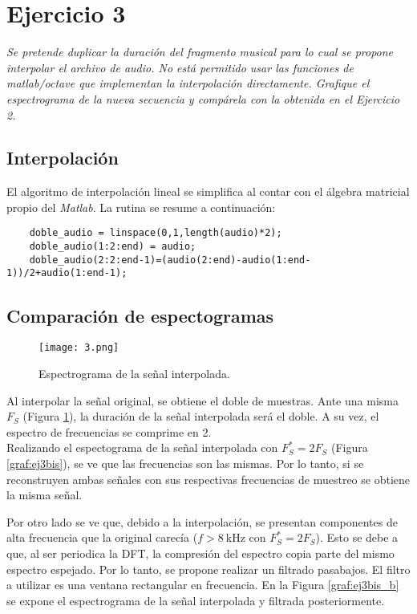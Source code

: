 

\section{Ejercicio 3} \label{ej3}
	\begin{flushleft}
		\textit{Se pretende duplicar la duración del fragmento musical para lo cual se propone interpolar el
archivo de audio. No está permitido usar las funciones de matlab/octave que implementan la
interpolación directamente. Grafique el espectrograma de la nueva secuencia y compárela con
la obtenida en el Ejercicio 2.}
	\end{flushleft}

	\subsection{Interpolación}
		El algoritmo de interpolación lineal se simplifica al contar con el álgebra matricial propio del \textit{Matlab}. La rutina se resume a continuación:
		\begin{lstlisting}
	doble_audio = linspace(0,1,length(audio)*2);
	doble_audio(1:2:end) = audio;
	doble_audio(2:2:end-1)=(audio(2:end)-audio(1:end-1))/2+audio(1:end-1);
		\end{lstlisting}

	\subsection{Comparación de espectogramas}

		\begin{figure}[h!]
			\centering
			\texttt{[image: 3.png]}
			\caption{Espectrograma de la señal interpolada.}
			\label{graf:ej3}
		\end{figure}
		Al interpolar la señal original, se obtiene el doble de muestras. Ante una misma $F_S$ (Figura \ref{graf:ej3}), la duración de la señal interpolada será el doble. A su vez, el espectro de frecuencias se comprime en 2.\\

		Realizando el espectograma de la señal interpolada con $F_S^*=2F_S$ (Figura \ref{graf:ej3bis}), se ve que las frecuencias son las mismas. Por lo tanto, si se reconstruyen ambas señales con sus respectivas frecuencias de muestreo se obtiene la misma señal.

		Por otro lado se ve que, debido a la interpolación, se presentan componentes de alta frecuencia que la original carecía ($f>\SI{8}{\kHz}$ con $F_S^*=2F_S$). Esto se debe a que, al ser periodica la DFT, la compresión del espectro copia parte del mismo espectro espejado. Por lo tanto, se propone realizar un filtrado pasabajos. El filtro a utilizar es una ventana rectangular en frecuencia. En la Figura \ref{graf:ej3bis_b} se expone el espectrograma de la señal interpolada y filtrada posteriormente.

